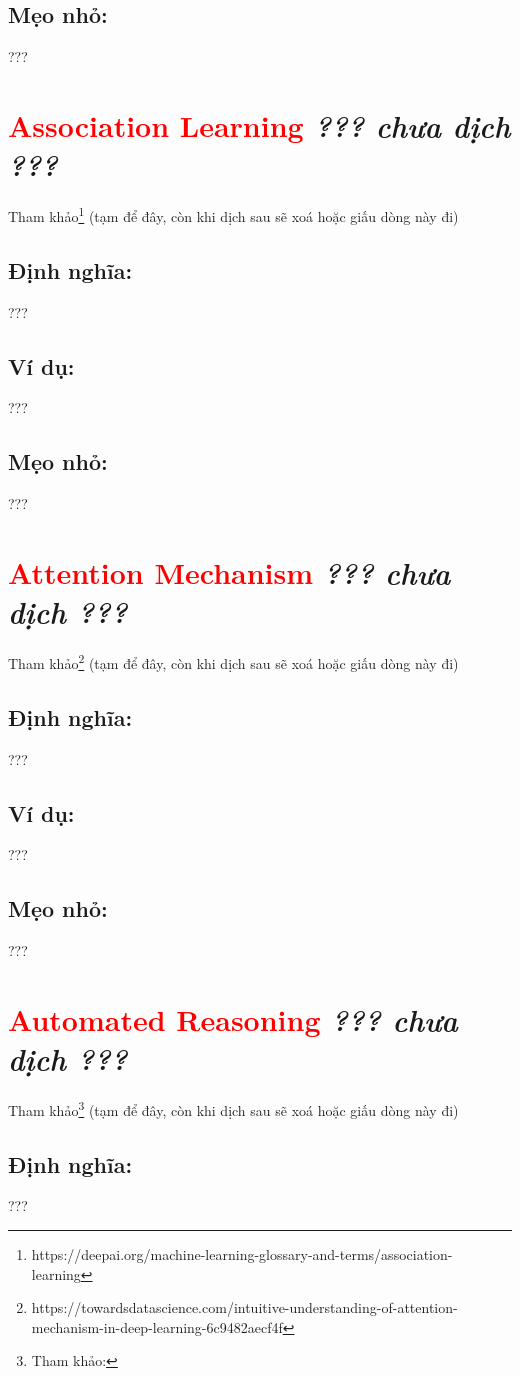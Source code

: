 \subsection*{Mẹo nhỏ:}
???
\section*{\huge \textcolor{Red}{Association Learning}  \small \textit{??? chưa dịch ???} }
Tham khảo\footnote{https://deepai.org/machine-learning-glossary-and-terms/association-learning} (tạm để đây, còn khi dịch sau sẽ xoá hoặc giấu dòng này đi)
\subsection*{Định nghĩa:}
???
\subsection*{Ví dụ:}
???
\subsection*{Mẹo nhỏ:}
???
\section*{\huge \textcolor{Red}{Attention Mechanism}  \small \textit{??? chưa dịch ???} }
Tham khảo\footnote{https://towardsdatascience.com/intuitive-understanding-of-attention-mechanism-in-deep-learning-6c9482aecf4f} (tạm để đây, còn khi dịch sau sẽ xoá hoặc giấu dòng này đi)
\subsection*{Định nghĩa:}
???
\subsection*{Ví dụ:}
???
\subsection*{Mẹo nhỏ:}
???
\section*{\huge \textcolor{Red}{Automated Reasoning}  \small \textit{??? chưa dịch ???} }
Tham khảo\footnote{Tham khảo:} (tạm để đây, còn khi dịch sau sẽ xoá hoặc giấu dòng này đi)
\subsection*{Định nghĩa:}
???
